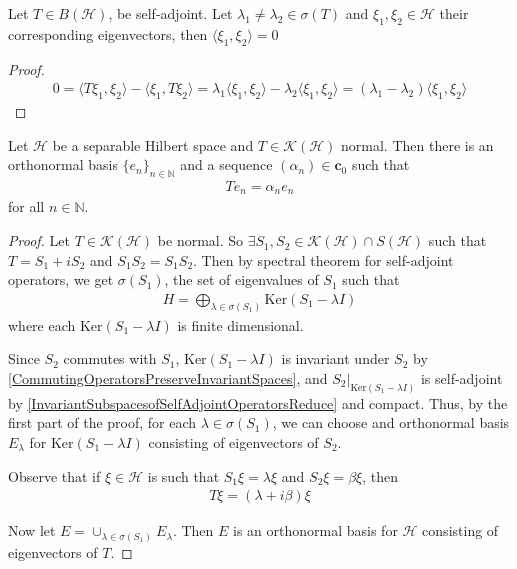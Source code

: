 \begin{lemma}
  \label{DistinctEigenvectorsAreOrthogonal}
  Let $T \in B(\mathcal{H})$, be self-adjoint. Let $\lambda_1 \neq
  \lambda_2 \in \sigma(T)$ and $\xi_1, \xi_2 \in \mathcal{H}$ their
  corresponding eigenvectors, then $ \langle \xi_1 , \xi_2 \rangle = 0$
\end{lemma}
\begin{proof}
  \begin{align*}
    0 = \langle T \xi_1 , \xi_2 \rangle - \langle \xi_1 , T\xi_2
    \rangle = \lambda_1 \langle  \xi_1 , \xi_2 \rangle - \lambda_2
    \langle \xi_1 , \xi_2 \rangle = (\lambda_1 - \lambda_2) \langle
    \xi_1 , \xi_2 \rangle
  \end{align*}
\end{proof}

\begin{theorem}
  Let $\mathcal{H}$ be a separable Hilbert space and $T \in
  \mathcal{K}(\mathcal{H})$ normal. Then there is an orthonormal
  basis $ \{ e_n \}_{n \in \mathbb{N}}$ and a sequence $(\alpha_n)
  \in \textbf{c}_{0}$ such that
  \begin{align*}
    T e_n = \alpha_n e_n
  \end{align*}
  for all $n \in \mathbb{N}$.
\end{theorem}
\begin{proof}
  Let $T \in \mathcal{K}(\mathcal{H})$ be normal. So $\exists S_1,
  S_{2} \in \mathcal{K}(\mathcal{H})\cap S(  \mathcal{H})$ such that
  $T = S_1 + i S_2$ and $S_{1}S_{2} = S_{1}S_{2}$. Then by spectral
  theorem for self-adjoint operators, we get $\sigma(S_{1})$, the set
  of eigenvalues of $S_{1}$ such that
  \begin{align*}
    H = \bigoplus_{\lambda \in \sigma(S_{1})}\textrm{Ker}(S_{1} - \lambda I)
  \end{align*}
  where each $\textrm{Ker}(S_{1} - \lambda I)$ is finite dimensional.

  Since $S_2$ commutes with $S_{1}$, $ \textrm{Ker}(S_{1} - \lambda
  I)$ is invariant under $S_2$ by
  \autoref{CommutingOperatorsPreserveInvariantSpaces}, and
  $S_2|_{\textrm{Ker}(S_{1} -
  \lambda I)}$ is self-adjoint by
  \autoref{InvariantSubspacesofSelfAdjointOperatorsReduce} and
  compact. Thus, by the first part
  of the proof, for each $\lambda \in \sigma(S_1)$, we can choose and
  orthonormal basis $E_\lambda$ for $\textrm{Ker}(S_1 - \lambda I )$
  consisting of eigenvectors of $S_2$.

  Observe that if $\xi \in \mathcal{H}$ is such that $S_{1} \xi
  =\lambda \xi$ and $S_2 \xi = \beta \xi$, then
  \begin{align*}
    T \xi = (\lambda + i \beta) \xi
  \end{align*}

  Now let $E = \cup_{\lambda \in  \sigma(S_1)} E_\lambda$. Then $E$
  is an orthonormal basis for $\mathcal{H}$ consisting of eigenvectors of $T$.
\end{proof}

